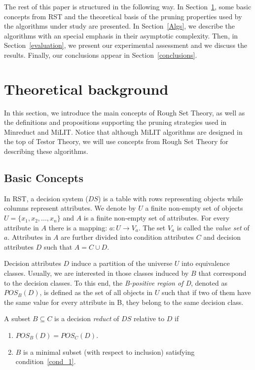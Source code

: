 \documentclass[citenumber]{llncs}
\begin{document}
	The rest of this paper is structured in the following way. In Section~\ref{tb}, some basic concepts from RST and the theoretical basis of the pruning properties used by the algorithms under study are presented. In Section~\ref{Algs}, we describe the algorithms with an special emphasis in their asymptotic complexity. Then, in Section~\ref{evaluation}, we present our experimental assessment and we discuss the results. Finally, our conclusions appear in Section~\ref{conclusions}.
						
%
\section{Theoretical background} \label{tb}
%

	In this section, we introduce the main concepts of Rough Set Theory, as well as the definitions and propositions supporting the pruning strategies used in Minreduct and MiLIT. Notice that although MiLIT algorithms are designed in the top of Testor Theory, we will use concepts from Rough Set Theory for describing these algorithms.

%
\subsection{Basic Concepts} \label{basic_concetps}
%
	In RST, a decision system ($DS$) is a table with rows representing objects while columns represent attributes. We denote by $U$ a finite non-empty set of objects $U=\lbrace x_1,x_2,...,x_n\rbrace$ and $A$ is a finite non-empty set of attributes. For every attribute in $A$ there is a mapping: $a: U \rightarrow V_a$. The set $V_a$ is called the \textit{value set} of $a$. Attributes in $A$ are further divided into condition attributes $C$ and decision attributes $D$ such that $A=C \cup D$. 

	Decision attributes $D$ induce a partition of the universe $U$ into equivalence classes. Usually, we are interested in those classes induced by $B$ that correspond to the decision classes. To this end, the \textit{B-positive region of D}, denoted as $POS_B(D)$, is defined as the set of all objects in $U$ such that if two of them have the same value for every attribute in B, they belong to the same decision class.

	A subset $B \subseteq C$ is a decision \textit{reduct} of $DS$ relative to $D$ if
	\begin{enumerate}
		\item $POS_B(D)=POS_C(D)$. \label{cond_1}
		\item $B$ is a minimal subset (with respect to inclusion) satisfying condition~\ref{cond_1}.\label{cond_2}
	\end{enumerate}
\end{document}
